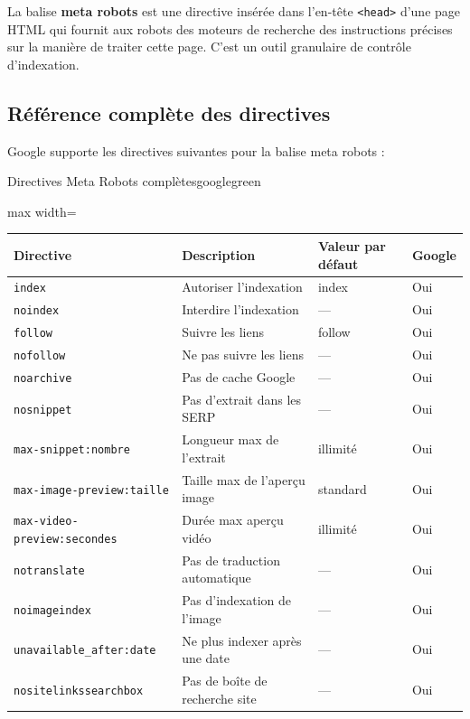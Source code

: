\documentclass[12pt,a4paper,twoside]{report}
\newcommand{\keyword}[1]{\textbf{\textcolor{googleblue}{#1}}}
\begin{document}
La balise \keyword{meta robots} est une directive insérée dans l'en-tête \texttt{<head>} d'une page HTML qui fournit aux robots des moteurs de recherche des instructions précises sur la manière de traiter cette page. C'est un outil granulaire de contrôle d'indexation.

\subsection{Référence complète des directives}

Google supporte les directives suivantes pour la balise meta robots :

\begin{mybox}{Directives Meta Robots complètes}{googlegreen}
\begin{adjustbox}{max width=\textwidth}
\begin{tabular}{|p{3.5cm}|p{4cm}|p{3.5cm}|p{3cm}|}
\hline
\textbf{Directive} & \textbf{Description} & \textbf{Valeur par défaut} & \textbf{Google} \\
\hline
\texttt{index} & Autoriser l'indexation & index & Oui \\
\hline
\texttt{noindex} & Interdire l'indexation & — & Oui \\
\hline
\texttt{follow} & Suivre les liens & follow & Oui \\
\hline
\texttt{nofollow} & Ne pas suivre les liens & — & Oui \\
\hline
\texttt{noarchive} & Pas de cache Google & — & Oui \\
\hline
\texttt{nosnippet} & Pas d'extrait dans les SERP & — & Oui \\
\hline
\texttt{max-snippet:nombre} & Longueur max de l'extrait & illimité & Oui \\
\hline
\texttt{max-image-preview:taille} & Taille max de l'aperçu image & standard & Oui \\
\hline
\texttt{max-video-preview:secondes} & Durée max aperçu vidéo & illimité & Oui \\
\hline
\texttt{notranslate} & Pas de traduction automatique & — & Oui \\
\hline
\texttt{noimageindex} & Pas d'indexation de l'image & — & Oui \\
\hline
\texttt{unavailable\_after:date} & Ne plus indexer après une date & — & Oui \\
\hline
\texttt{nositelinkssearchbox} & Pas de boîte de recherche site & — & Oui \\
\hline
\end{tabular}
\end{adjustbox}
\end{mybox}
\end{document}
